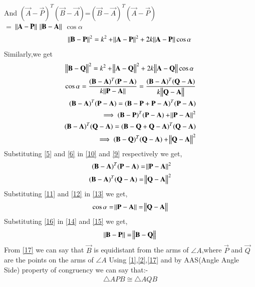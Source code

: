 \documentclass[journal,12pt,twocolumn]{IEEEtran}
\begin{document}
And $(\vec{A}-\vec{P})^T(\vec{B}-\vec{A})$=$(\vec{B}-\vec{A})^T(\vec{A}-\vec{P})$\\
 $=$ $\norm{\mathbf{A}-\mathbf{P}}$ $\norm{\mathbf{B}-\mathbf{A}}$ $\cos\alpha$\\
\begin{align}
  \begin{split}
      \norm{\mathbf{B}-\mathbf{P}}^2=k^2+\norm{\mathbf{A}-\mathbf{P}}^2
      +2k\norm{\mathbf{A}-\mathbf{P}}\cos\alpha\label{14}
  \end{split}  
\end{align}
Similarly,we get
\begin{align}
    \norm{\mathbf{B}-\mathbf{Q}}^2=k^2+\norm{\mathbf{A}-\mathbf{Q}}^2
      +2k\norm{\mathbf{A}-\mathbf{Q}}\cos\alpha\label{15}
\end{align}
\begin{align}
    \cos\alpha = \frac{(\mathbf{B}-\mathbf{A})^T(\mathbf{P}-\mathbf{A})}{k\norm{\mathbf{P}-\mathbf{A}}} = \frac{(\mathbf{B}-\mathbf{A})^T(\mathbf{Q}-\mathbf{A})}{k\norm{\mathbf{Q}-\mathbf{A}}}\label{13}\\
    (\mathbf{B}-\mathbf{A})^T(\mathbf{P}-\mathbf{A})=(\mathbf{B}-\mathbf{P}+\mathbf{P}-\mathbf{A})^T(\mathbf{P}-\mathbf{A})\\
    \implies (\mathbf{B}-\mathbf{P})^T(\mathbf{P}-\mathbf{A}) + \norm{\mathbf{P}-\mathbf{A}}^2\label{9}\\
    (\mathbf{B}-\mathbf{A})^T(\mathbf{Q}-\mathbf{A})=(\mathbf{B}-\mathbf{Q}+\mathbf{Q}-\mathbf{A})^T(\mathbf{Q}-\mathbf{A})\\
     \implies (\mathbf{B}-\mathbf{Q})^T(\mathbf{Q}-\mathbf{A}) + \norm{\mathbf{Q}-\mathbf{A}}^2\label{10}
\end{align}
Substituting \eqref{5} and \eqref{6} in \eqref{10} and \eqref{9} respectively we get,
\begin{align}
    (\mathbf{B}-\mathbf{A})^T(\mathbf{P}-\mathbf{A})=\norm{\mathbf{P}-\mathbf{A}}^2\label{11}\\
    (\mathbf{B}-\mathbf{A})^T(\mathbf{Q}-\mathbf{A})=\norm{\mathbf{Q}-\mathbf{A}}^2\label{12}
\end{align}
Substituting \eqref{11} and \eqref{12} in \eqref{13} we get,
\begin{align}
    \cos\alpha=\norm{\mathbf{P}-\mathbf{A}}=\norm{\mathbf{Q}-\mathbf{A}}\label{16}
\end{align}
Substituting \eqref{16} in \eqref{14} and \eqref{15} we get,
\begin{align}
    \norm{\mathbf{B}-\mathbf{P}}=\norm{\mathbf{B}-\mathbf{Q}}\label{17}
\end{align}
From \eqref{17} we can say that $\vec{B}$ is equidistant from the arms of $\angle{A}$,where $\vec{P}$ and $\vec{Q}$ are the points on the arms of $\angle{A}$
Using \eqref{1},\eqref{2},\eqref{17} and by AAS(Angle Angle Side) property of congruency we can say that:-\\
\begin{align}
\triangle APB \cong \triangle AQB
\end{align}
\end{document}
